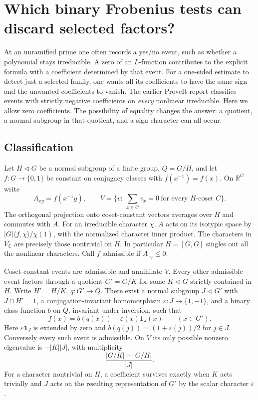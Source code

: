 \section{Which binary Frobenius tests can discard selected factors?}
\label{sec:binary}
At an unramified prime one often records a yes/no event, such as whether a polynomial stays irreducible. A zero of an $L$-function contributes to the explicit formula with a coefficient determined by that event. For a one-sided estimate to detect just a selected family, one wants all its coefficients to have the same sign and the unwanted coefficients to vanish. The earlier ProveIt report \cite{packetmc} classifies events with strictly negative coefficients on \emph{every} nonlinear irreducible. Here we allow zero coefficients. The possibility of equality changes the answer: a quotient, a normal subgroup in that quotient, and a sign character can all occur.

\subsection{Classification}
Let $H\triangleleft G$ be a normal subgroup of a finite group, $Q=G/H$, and let $f:G\to\{0,1\}$ be constant on conjugacy classes with $f(x^{-1})=f(x)$. On $\mathbb R^G$ write
\[
 A_{xy}=f(x^{-1}y),\qquad
 V=\{v:\ \sum_{x\in C}v_x=0\ \text{for every }H\text{-coset }C\}.
\]
The orthogonal projection onto coset-constant vectors averages over $H$ and commutes with $A$. For an irreducible character $\chi$, $A$ acts on its isotypic space by $|G|\langle f,\chi\rangle/\chi(1)$, with the normalized character inner product. The characters in $V_{\mathbb C}$ are precisely those nontrivial on $H$. In particular $H=[G,G]$ singles out all the nonlinear characters. Call $f$ admissible if $A|_V\le0$.

\begin{theorem}\label{th:binary}
Coset-constant events are admissible and annihilate $V$. Every other admissible event factors through a quotient $G'=G/K$ for some $K\triangleleft G$ strictly contained in $H$. Write $H'=H/K$, $q:G'\to Q$. There exist a normal subgroup $J\triangleleft G'$ with $J\cap H'=1$, a conjugation-invariant homomorphism $\varepsilon:J\to\{1,-1\}$, and a binary class function $b$ on $Q$, invariant under inversion, such that
\begin{equation}\label{eq:binary}
 f(x)=b(q(x))-\varepsilon(x)\mathbf 1_J(x)\qquad(x\in G').
\end{equation}
Here $\varepsilon\mathbf 1_J$ is extended by zero and $b(q(j))=(1+\varepsilon(j))/2$ for $j\in J$. Conversely every such event is admissible. On $V$ its only possible nonzero eigenvalue is $-|K||J|$, with multiplicity
\[
               \frac{|G/K|-|G/H|}{|J|}.
\]
For a character nontrivial on $H$, a coefficient survives exactly when $K$ acts trivially and $J$ acts on the resulting representation of $G'$ by the scalar character $\varepsilon$.
\end{theorem}

